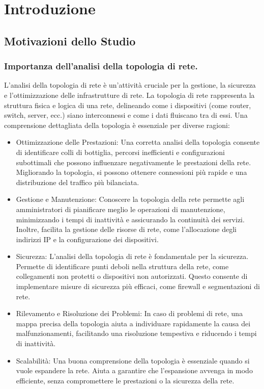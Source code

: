 \documentclass[target=bach,aauheader=,style=]{thud}
\begin{document}
\chapter{Introduzione}
\section{Motivazioni dello Studio}
\subsection{Importanza dell'analisi della topologia di rete.}
L'analisi della topologia di rete è un'attività cruciale per la gestione, la sicurezza e l'ottimizzazione delle infrastrutture di rete. La topologia di rete rappresenta la struttura fisica e logica di una rete, delineando come i dispositivi (come router, switch, server, ecc.) siano interconnessi e come i dati fluiscano tra di essi. Una comprensione dettagliata della topologia è essenziale per diverse ragioni:
\begin{itemize}
  \item Ottimizzazione delle Prestazioni: Una corretta analisi della topologia consente di identificare colli di bottiglia, percorsi inefficienti e configurazioni subottimali che possono influenzare negativamente le prestazioni della rete. Migliorando la topologia, si possono ottenere connessioni più rapide e una distribuzione del traffico più bilanciata.
  \item Gestione e Manutenzione: Conoscere la topologia della rete permette agli amministratori di pianificare meglio le operazioni di manutenzione, minimizzando i tempi di inattività e assicurando la continuità dei servizi. Inoltre, facilita la gestione delle risorse di rete, come l'allocazione degli indirizzi IP e la configurazione dei dispositivi.
  \item Sicurezza: L'analisi della topologia di rete è fondamentale per la sicurezza. Permette di identificare punti deboli nella struttura della rete, come collegamenti non protetti o dispositivi non autorizzati. Questo consente di implementare misure di sicurezza più efficaci, come firewall e segmentazioni di rete.
  \item Rilevamento e Risoluzione dei Problemi: In caso di problemi di rete, una mappa precisa della topologia aiuta a individuare rapidamente la causa dei malfunzionamenti, facilitando una risoluzione tempestiva e riducendo i tempi di inattività.
  \item Scalabilità: Una buona comprensione della topologia è essenziale quando si vuole espandere la rete. Aiuta a garantire che l'espansione avvenga in modo efficiente, senza compromettere le prestazioni o la sicurezza della rete.
\end{itemize}
\end{document}
